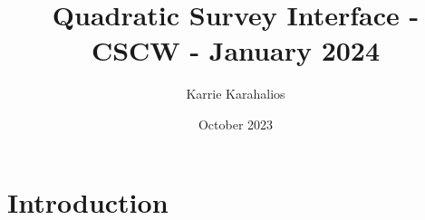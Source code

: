 \documentclass{article}
\title{Quadratic Survey Interface - CSCW - January 2024}
\author{Karrie Karahalios}
\date{October 2023}
\begin{document}
\maketitle

\section{Introduction}
\end{document}
